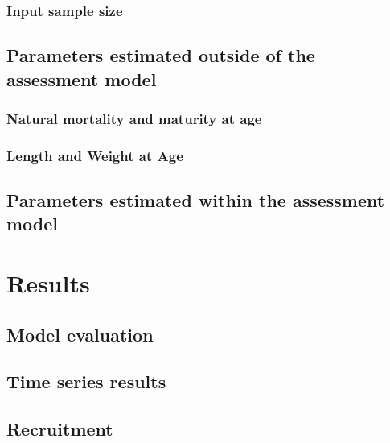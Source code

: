 \documentclass[11pt,]{article}
\begin{document}
\hypertarget{input-sample-size}{%
\subsubsection{Input sample size}\label{input-sample-size}}

\hypertarget{parameters-estimated-outside-of-the-assessment-model}{%
\subsection{Parameters estimated outside of the assessment
model}\label{parameters-estimated-outside-of-the-assessment-model}}

\hypertarget{natural-mortality-and-maturity-at-age}{%
\subsubsection{Natural mortality and maturity at
age}\label{natural-mortality-and-maturity-at-age}}

\hypertarget{length-and-weight-at-age}{%
\subsubsection{Length and Weight at
Age}\label{length-and-weight-at-age}}

\hypertarget{parameters-estimated-within-the-assessment-model}{%
\subsection{Parameters estimated within the assessment
model}\label{parameters-estimated-within-the-assessment-model}}

\hypertarget{results}{%
\section{Results}\label{results}}

\hypertarget{model-evaluation}{%
\subsection{Model evaluation}\label{model-evaluation}}

\hypertarget{time-series-results}{%
\subsection{Time series results}\label{time-series-results}}

\hypertarget{recruitment}{%
\subsection{Recruitment}\label{recruitment}}
\end{document}

